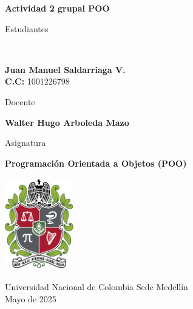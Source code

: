 \begin{titlepage}
	\Large{
	\begin{center}
		\vspace*{1cm}
 
		\textbf{Actividad 2 grupal POO}
 
			 
		\vspace{1.5cm}
		
		Estudiantes
		
		\vspace{0.5cm}
		 \
 
		  \textbf{Juan Manuel Saldarriaga V.} \\
		  \textbf{C.C:} 1001226798 \\
		  
	 
 
	   \vspace{1cm}
		
		Docente 
		
		\vspace{0.5cm}
 
		\textbf{Walter Hugo Arboleda Mazo}
		
		\vspace{0.4cm}
 
		\vspace{1.4cm}
		
		Asignatura
		
		\vspace{0.5cm}
 
		\textbf{Programación Orientada a Objetos (POO)}
 
		\vfill
 
		\includegraphics[width=3cm,height=4cm]{logo.png}\\[0.5cm]
	  
		\vspace{0.4cm}
	  
				 
		Universidad Nacional de Colombia Sede Medellín\\
		Mayo de 2025
		
	\end{center}
	}
 \end{titlepage}